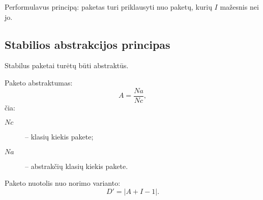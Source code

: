 Performulavus principą: paketas turi priklausyti nuo paketų, kurių
$I$ mažesnis nei jo.

\subsection{Stabilios abstrakcijos principas}

\label{subsection:package:sap}


Stabilus paketai turėtų būti abstraktūs.

Paketo abstraktumas:
\begin{equation*}
  A = \frac{Na}{Nc},
\end{equation*}
čia:
\begin{description}
  \item[$Nc$] – klasių kiekis pakete;
  \item[$Na$] – abstrakčių klasių kiekis pakete.
\end{description}

Paketo nuotolis nuo norimo varianto:
\begin{equation*}
  D' = |A + I - 1|.
\end{equation*}
